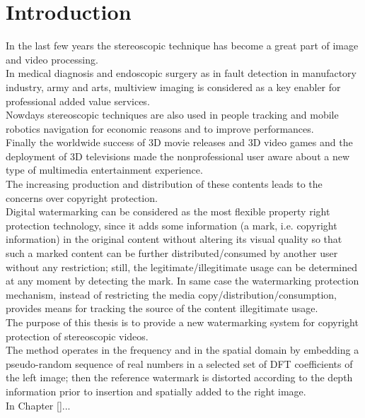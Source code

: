 \chapter*{Introduction}
\label{intro}
{}

In the last few years the stereoscopic technique has become a great part of image and video processing.\\
In medical diagnosis and endoscopic surgery as in fault detection in manufactory industry, army and arts,
multiview imaging is considered as a key enabler  for professional added value services.\\
Nowdays stereoscopic techniques are also used in people tracking and mobile robotics
navigation for economic reasons and to improve performances.\\
Finally the worldwide success of 3D movie releases and 3D video games and the deployment of 3D televisions made the nonprofessional user aware about a new type of multimedia entertainment experience.\\
The increasing production and distribution of these contents leads to the concerns over copyright protection.\\
Digital watermarking can be considered as the most flexible property right protection technology, since it adds some information (a mark, i.e. copyright information) in the
original content without altering its visual quality so that such a marked content can be further distributed/consumed by another user without any restriction; still, the legitimate/illegitimate usage can be determined at any moment by detecting the mark. In same case the watermarking protection mechanism, instead of restricting the media copy/distribution/consumption, provides means for tracking the source of the content illegitimate usage.\\
The purpose of this thesis is to provide a new watermarking system for copyright protection of stereoscopic videos.\\
The method operates in the frequency and in the spatial domain by embedding a pseudo-random sequence of real numbers in a selected set of DFT coefficients of the left image; then the reference watermark is distorted according to the depth information prior to insertion and spatially added to the right image.\\
In Chapter \ref{}...